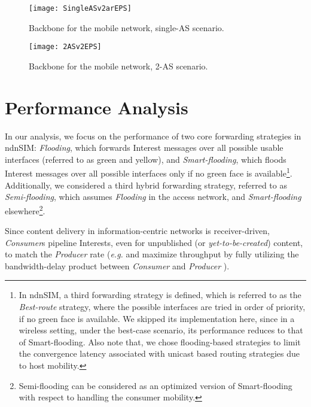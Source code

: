 \documentclass[conference]{IEEEtran}
\begin{document}
\begin{figure}[htb]
  \centering
\texttt{[image: SingleASv2arEPS]}\\
  \caption{Backbone for the mobile network, single-AS scenario.}\label{CCN_wireless_scenario_2}
\end{figure}

\begin{figure}[htb]
  \centering
\texttt{[image: 2ASv2EPS]}\\
\caption{Backbone for the mobile network, 2-AS scenario.}\label{CCN_wireless_scenario_3}
\end{figure}

\section{Performance Analysis}\label{Section:Performance}

In our analysis, we focus on the performance of two core forwarding strategies in ndnSIM:  \emph{Flooding}, which forwards Interest messages over all possible usable interfaces (referred to as green and yellow), and  \emph{Smart-flooding}, which floods Interest messages over all possible interfaces only if no green face is available\footnote{In ndnSIM, a third forwarding strategy is defined, which is referred to as the \emph{Best-route} strategy, where the possible interfaces are tried in order of priority, if no green face is available. We skipped its implementation here, since in a wireless setting, under the best-case scenario, its performance reduces to that of Smart-flooding. Also note that, we chose flooding-based strategies to limit the convergence latency associated with unicast based routing strategies due to host mobility.}. Additionally, we considered a third hybrid forwarding strategy, referred to as \emph{Semi-flooding}, which assumes \emph{Flooding} in the access network, and \emph{Smart-flooding} elsewhere\footnote{Semi-flooding can be considered as an optimized version of Smart-flooding with respect to handling the consumer mobility.}.

Since content delivery in information-centric networks is receiver-driven, \emph{Consumer}s pipeline Interests, even for unpublished (or \emph{yet-to-be-created}) content, to match the \emph{Producer} rate (\emph{e.g.} and maximize throughput by fully utilizing the bandwidth-delay product between \emph{Consumer} and \emph{Producer} \cite{VoCCN}).
\end{document}
